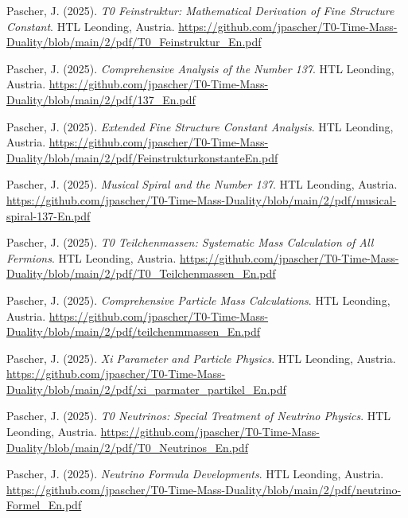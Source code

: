\documentclass{article}
\begin{document}
\begin{thebibliography}{99}
		Pascher, J. (2025).
		\textit{T0 Feinstruktur: Mathematical Derivation of Fine Structure Constant}.
		HTL Leonding, Austria.
		\url{https://github.com/jpascher/T0-Time-Mass-Duality/blob/main/2/pdf/T0_Feinstruktur_En.pdf}
		
		Pascher, J. (2025).
		\textit{Comprehensive Analysis of the Number 137}.
		HTL Leonding, Austria.
		\url{https://github.com/jpascher/T0-Time-Mass-Duality/blob/main/2/pdf/137_En.pdf}
		
		Pascher, J. (2025).
		\textit{Extended Fine Structure Constant Analysis}.
		HTL Leonding, Austria.
		\url{https://github.com/jpascher/T0-Time-Mass-Duality/blob/main/2/pdf/FeinstrukturkonstanteEn.pdf}
		
		Pascher, J. (2025).
		\textit{Musical Spiral and the Number 137}.
		HTL Leonding, Austria.
		\url{https://github.com/jpascher/T0-Time-Mass-Duality/blob/main/2/pdf/musical-spiral-137-En.pdf}
		
		
		Pascher, J. (2025).
		\textit{T0 Teilchenmassen: Systematic Mass Calculation of All Fermions}.
		HTL Leonding, Austria.
		\url{https://github.com/jpascher/T0-Time-Mass-Duality/blob/main/2/pdf/T0_Teilchenmassen_En.pdf}
		
		Pascher, J. (2025).
		\textit{Comprehensive Particle Mass Calculations}.
		HTL Leonding, Austria.
		\url{https://github.com/jpascher/T0-Time-Mass-Duality/blob/main/2/pdf/teilchenmmassen_En.pdf}
		
		Pascher, J. (2025).
		\textit{Xi Parameter and Particle Physics}.
		HTL Leonding, Austria.
		\url{https://github.com/jpascher/T0-Time-Mass-Duality/blob/main/2/pdf/xi_parmater_partikel_En.pdf}
		
		
		Pascher, J. (2025).
		\textit{T0 Neutrinos: Special Treatment of Neutrino Physics}.
		HTL Leonding, Austria.
		\url{https://github.com/jpascher/T0-Time-Mass-Duality/blob/main/2/pdf/T0_Neutrinos_En.pdf}
		
		Pascher, J. (2025).
		\textit{Neutrino Formula Developments}.
		HTL Leonding, Austria.
		\url{https://github.com/jpascher/T0-Time-Mass-Duality/blob/main/2/pdf/neutrino-Formel_En.pdf}
		

\end{thebibliography}
\end{document}
